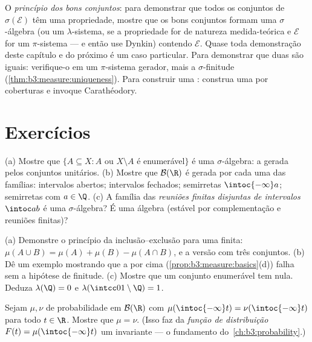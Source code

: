 \begin{method}\label{met:b3:measure:goodsets}
O \emph{princípio dos bons conjuntos}: para demonstrar que todos os
conjuntos de $\sigma(\mathcal E)$ têm uma propriedade, mostre que os bons conjuntos
formam uma $\sigma$-álgebra (ou um $\lambda$-sistema, se a propriedade
for de natureza medida-teórica e $\mathcal E$ for um $\pi$-sistema --- e
então use Dynkin) contendo $\mathcal E$. Quase toda demonstração deste
capítulo e do próximo é um caso particular. Para demonstrar que duas
 são iguais: verifique-o em um $\pi$-sistema gerador, mais a
$\sigma$-finitude (\cref{thm:b3:measure:uniqueness}). Para construir uma :
construa uma  por coberturas e invoque Carathéodory.
\end{method}

\section{Exercícios}

\begin{exercise}[$\star$]\label{exo:b3:measure:1}
(a) Mostre que $\{A \subseteq X : A$ ou $X\setminus A$ é enumerável$\}$ é uma
$\sigma$-álgebra: a gerada pelos conjuntos unitários.
(b) Mostre que $\mathcal B(\R)$ é gerada por cada uma das famílias: intervalos
abertos; intervalos fechados; semirretas $\intoc{-\infty}a$; semirretas com $a \in \Q$.
(c) A família das \emph{reuniões finitas disjuntas de intervalos}
$\intoc ab$ é uma $\sigma$-álgebra? É uma álgebra (estável por
complementação e reuniões finitas)?
\end{exercise}

\begin{exercise}[$\star$]\label{exo:b3:measure:2}
(a) Demonstre o princípio da inclusão--exclusão para uma  finita:
$\mu(A\cup
B) = \mu(A) + \mu(B) - \mu(A\cap B)$, e a versão com três conjuntos.
(b) Dê um exemplo mostrando que a  por cima
(\cref{prop:b3:measure:basics}(d)) falha sem a hipótese de finitude.
(c) Mostre que um conjunto enumerável tem  nula.
Deduza $\lambda(\Q) = 0$ e $\lambda(\intcc01\setminus\Q) =
1$.
\end{exercise}

\begin{exercise}[$\star\star$]\label{exo:b3:measure:3}
Sejam $\mu, \nu$  de probabilidade em $\mathcal B(\R)$ com $\mu(\intoc{-\infty}t) = \nu(\intoc{-\infty}t)$ para todo $t \in \R$.
Mostre que $\mu = \nu$. (Isso faz da \emph{função de distribuição} $F(t) = \mu(\intoc{-\infty}t)$ um
invariante  --- o fundamento do~\cref{ch:b3:probability}.)
\end{exercise}

